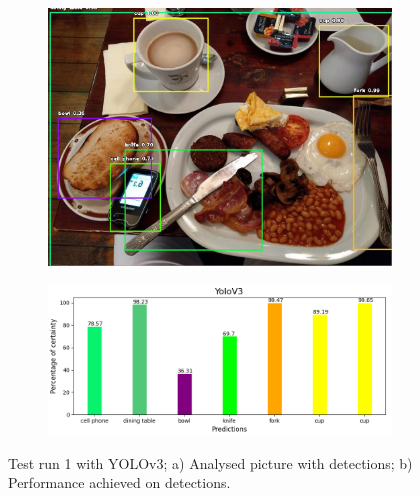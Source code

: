      
        \begin{figure}[H]
          \centering
          \captionsetup{justification=centering}
  
          \begin{subfigure}{0.29\textwidth}
          \includegraphics[width=\textwidth]{Sections/4InitialWork/4_images_obj_run1/yolo.jpg} 
          \caption{}
          \end{subfigure}
          \begin{subfigure}{0.65\textwidth}
          \includegraphics[width=\textwidth]{Sections/4InitialWork/4_images_obj_run1/yolo_graph.png}
          \caption{}
          
          \end{subfigure}
          
          \caption[Test run 1 with YOLOv3]{ 
          Test run 1 with YOLOv3; a) Analysed picture with detections; b) Performance achieved on detections. }
          \label{fig:yolo_1}
          \end{figure}
      


